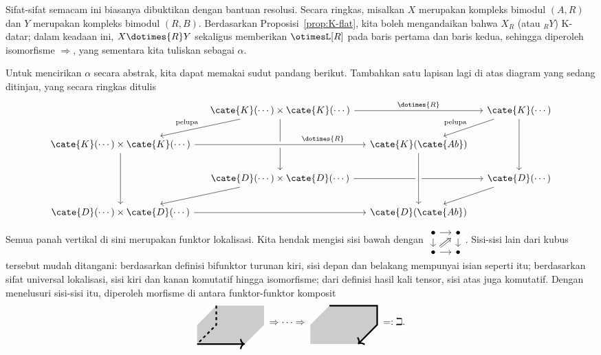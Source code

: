 \begin{bukti}
	Sifat-sifat semacam ini biasanya dibuktikan dengan bantuan resolusi. Secara
	ringkas, misalkan $X$ merupakan kompleks bimodul $(A,R)$ dan $Y$ merupakan
	kompleks bimodul $(R,B)$. Berdasarkan Proposisi~\ref{prop:K-flat}, kita boleh
	mengandaikan bahwa $X_R$ (atau ${}_RY$) K-datar; dalam keadaan ini,
	$X\dotimes{R}Y$ sekaligus memberikan $\otimesL[R]$ pada baris pertama dan
	baris kedua, sehingga diperoleh isomorfisme $\Rightarrow$, yang sementara
	kita tuliskan sebagai $\alpha$.

	Untuk mencirikan $\alpha$ secara abstrak, kita dapat memakai sudut pandang
	berikut. Tambahkan satu lapisan lagi di atas diagram yang sedang ditinjau,
	yang secara ringkas ditulis
	\[\begin{tikzcd}[column sep=small]
		& \cate{K}(\cdots) \times \cate{K}(\cdots) \arrow[dd] \arrow[ld, "\text{pelupa}"'] \arrow[rr, "\dotimes{R}"] & & \cate{K}(\cdots) \arrow[dd] \arrow[ld, "\text{pelupa}"'] \\
		\cate{K}(\cdots) \times \cate{K}(\cdots) \arrow[rr, crossing over, "\dotimes{R}" near end] \arrow[dd] & & \cate{K}(\cate{Ab}) & \\
		& \cate{D}(\cdots) \times \cate{D}(\cdots) \arrow[rr] \arrow[ld] & & \cate{D}(\cdots) \arrow[ld] \\
		\cate{D}(\cdots) \times \cate{D}(\cdots) \arrow[rr] & & \cate{D}(\cate{Ab}) \arrow[leftarrow, uu, crossing over] &
	\end{tikzcd}\]
	Semua panah vertikal di sini merupakan funktor lokalisasi. Kita hendak
	mengisi sisi bawah dengan
	$\begin{tikzcd}[row sep=small, column sep=small]
		\bullet \arrow[r] \arrow[d] & \bullet \arrow[d] \\
		\bullet \arrow[r] \arrow[Rightarrow, ru] & \bullet
	\end{tikzcd}$.
	Sisi-sisi lain dari kubus tersebut mudah ditangani: berdasarkan definisi
	bifunktor turunan kiri, sisi depan dan belakang mempunyai isian seperti itu;
	berdasarkan sifat universal lokalisasi, sisi kiri dan kanan komutatif hingga
	isomorfisme; dari definisi hasil kali tensor, sisi atas juga komutatif. Dengan
	menelusuri sisi-sisi itu, diperoleh morfisme di antara funktor-funktor
	komposit
	\[\begin{tikzpicture}[baseline, scale=0.7]
		\fill[gray!40] (0, 1) -- (-1, 0) -- (-1, -1) -- (1.5, -1) --(2.5, 0) -- (2.5, 1)  --cycle;
		\draw[ultra thick, dashed] (0,1) -- (0,0) -- (-1, -1);
		\draw[ultra thick, ->] (-1, -1) -- (1.5, -1);
	\end{tikzpicture} \;\Rightarrow \cdots \Rightarrow\; \begin{tikzpicture}[baseline, scale=0.7]
		\fill[gray!40] (-1, 1) -- (1.5, 1) -- (1.5, 0) -- (0.5, -1) -- (-2, -1) -- (-2, 0) --cycle;
		\draw[ultra thick, ->] (-1,1) -- (1.5 , 1) -- (1.5, 0)  -- (0.5, -1);
	\end{tikzpicture} \; =: \beth. \]


\end{bukti}
